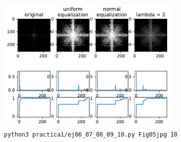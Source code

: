 \documentclass[11pt, spanish]{article}
\begin{document}
\begin{figure}[H]
\centering
  \includegraphics[width=0.8\textwidth]{informe-imgs/ej10-5.pdf}
  \caption{\texttt{python3 practica1/ej06\_07\_08\_09\_10.py Fig05jpg 10}}
\end{figure}
\end{document}
